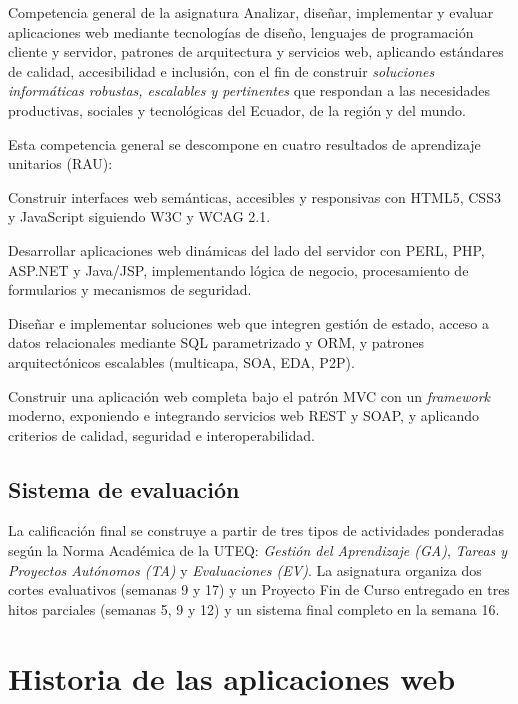 \documentclass[11pt,a4paper,openany]{book}
\begin{document}
\begin{cajadefinicion}{Competencia general de la asignatura}
Analizar, diseñar, implementar y evaluar aplicaciones web mediante
tecnologías de diseño, lenguajes de programación cliente y servidor,
patrones de arquitectura y servicios web, aplicando estándares de
calidad, accesibilidad e inclusión, con el fin de construir
\emph{soluciones informáticas robustas, escalables y pertinentes} que
respondan a las necesidades productivas, sociales y tecnológicas del
Ecuador, de la región y del mundo.
\end{cajadefinicion}

Esta competencia general se descompone en cuatro resultados de
aprendizaje unitarios (RAU):

\begin{description}[leftmargin=1.5cm]
\item[RAU 1.] Construir interfaces web semánticas, accesibles y
responsivas con HTML5, CSS3 y JavaScript siguiendo W3C y WCAG 2.1.
\item[RAU 2.] Desarrollar aplicaciones web dinámicas del lado del
servidor con PERL, PHP, ASP.NET y Java/JSP, implementando lógica de
negocio, procesamiento de formularios y mecanismos de seguridad.
\item[RAU 3.] Diseñar e implementar soluciones web que integren gestión
de estado, acceso a datos relacionales mediante SQL parametrizado y
ORM, y patrones arquitectónicos escalables (multicapa, SOA, EDA, P2P).
\item[RAU 4.] Construir una aplicación web completa bajo el patrón MVC
con un \emph{framework} moderno, exponiendo e integrando servicios web
REST y SOAP, y aplicando criterios de calidad, seguridad e
interoperabilidad.
\end{description}

\subsection{Sistema de evaluación}

La calificación final se construye a partir de tres tipos de
actividades ponderadas según la Norma Académica de la UTEQ:
\emph{Gestión del Aprendizaje (GA)}, \emph{Tareas y Proyectos
Autónomos (TA)} y \emph{Evaluaciones (EV)}. La asignatura organiza dos
cortes evaluativos (semanas 9 y 17) y un Proyecto Fin de Curso
entregado en tres hitos parciales (semanas 5, 9 y 12) y un sistema
final completo en la semana 16.

\section{Historia de las aplicaciones web}
\end{document}

